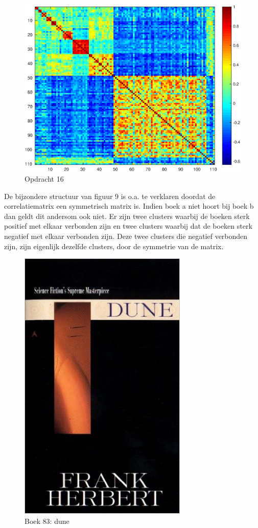 \documentclass[11pt,a4paper]{article}
\begin{document}
\begin{figure}[H]
\centering
\includegraphics[scale=0.55]{opdracht16}
\caption{Opdracht 16}
\end{figure}
De bijzondere structuur van figuur 9 is o.a. te verklaren doordat de correlatiematrix een symmetrisch matrix is. Indien boek a niet hoort bij boek b dan geldt dit andersom ook niet. Er zijn twee clusters waarbij de boeken sterk positief met elkaar verbonden zijn en twee clusters waarbij dat de boeken sterk negatief met elkaar verbonden zijn. Deze twee clusters die negatief verbonden zijn, zijn eigenlijk dezelfde clusters, door de symmetrie van de matrix. 

\begin{figure}[H]
\centering
\includegraphics[scale=0.30]{fueled44}
\caption{Boek 83: dune}
\end{figure}
\end{document}
